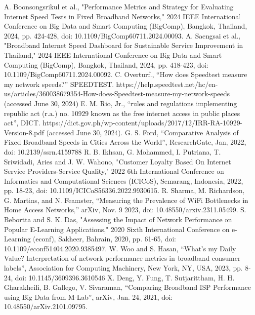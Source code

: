 \documentclass[conference]{IEEEtran}
\begin{document}

\begin{thebibliography}{00}
 A. Boonsongsrikul et al., "Performance Metrics and Strategy for Evaluating Internet Speed Tests in Fixed Broadband Networks," 2024 IEEE International Conference on Big Data and Smart Computing (BigComp), Bangkok, Thailand, 2024, pp. 424-428, doi: 10.1109/BigComp60711.2024.00093.
 A. Saengsai et al., "Broadband Internet Speed Dashboard for Sustainable Service Improvement in Thailand," 2024 IEEE International Conference on Big Data and Smart Computing (BigComp), Bangkok, Thailand, 2024, pp. 418-423, doi: 10.1109/BigComp60711.2024.00092. 
 C. Overturf., “How does Speedtest measure my network speeds?” SPEEDTEST. https://help.speedtest.net/hc/en-us/articles/360038679354-How-does-Speedtest-measure-my-network-speeds (accessed June 30, 2024)
 E. M. Rio, Jr.,  “rules and regulations implementing republic act (r.a.) no. 10929 known as the free internet access in public places act”, DICT. https://dict.gov.ph/wp-content/uploads/2017/12/IRR-RA-10929-Version-8.pdf (accessed June 30, 2024).
 G. S. Ford, “Comparative Analysis of Fixed Broadband Speeds in Cities Across the World”, ResearchGate, Jan, 2022, doi: 10.2139/ssrn.4159788
 R. B. Ikhsan, G. Mohammed, I. Putriana, T. Sriwidadi, Aries and J. W. Wahono, "Customer Loyalty Based On Internet Service Providers-Service Quality," 2022 6th International Conference on Informatics and Computational Sciences (ICICoS), Semarang, Indonesia, 2022, pp. 18-23, doi: 10.1109/ICICoS56336.2022.9930615.
 R. Sharma, M. Richardson, G. Martins, and N. Feamster, “Measuring the Prevalence of WiFi Bottlenecks in Home Access Networks,” arXiv, Nov. 9 2023, doi: 10.48550/arxiv.2311.05499.
 S. Bebortta and S. K. Das, "Assessing the Impact of Network Performance on Popular E-Learning Applications," 2020 Sixth International Conference on e-Learning (econf), Sakheer, Bahrain, 2020, pp. 61-65, doi: 10.1109/econf51404.2020.9385497.
 W. Woo and S. Hasan, “What's my Daily Value? Interpretation of network performance metrics in broadband consumer labels”, Association for Computing Machinery, New York, NY, USA, 2023, pp. 8-24, doi: 10.1145/3609396.3610546
 X. Deng, Y. Fung, T. Sutjarittham, H. H. Gharakheili, B. Gallego, V. Sivaraman, “Comparing Broadband ISP Performance using Big Data from M-Lab”, arXiv, Jan. 24, 2021, doi: 10.48550/arXiv.2101.09795.
\end{thebibliography}
\end{document}
